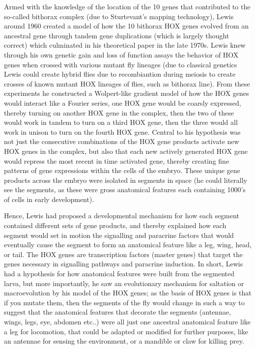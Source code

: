 Armed with the knowledge of the location of the 10 genes that contributed to the so-called bithorax complex (due to Sturtevant's mapping technology), Lewis around 1960 created a model of how the 10 bithorax HOX genes evolved from an ancestral gene through tandem gene duplications (which is largely thought correct) which culminated in his theoretical paper in the late 1970s.  Lewis knew through his own genetic gain and loss of function assays the behavior of HOX genes when crossed with various mutant fly lineages (due to classical genetics Lewis could create hybrid flies due to recombiantion during meiosis to create crosses of known mutant HOX lineages of flies, such as bithorax line).  From these experiments he constructed a Wolpert-like gradient model of how the HOX genes would interact like a Fourier series, one HOX gene would be coarsly expressed, thereby turning on another HOX gene in the complex, then the two of these would work in tandem to turn on a third HOX gene, then the three would all work in unison to turn on the fourth HOX gene.  Central to his hypothesis was not just the consecutive combinations of the HOX gene products activate new HOX genes in the complex, but also that each new actively generated HOX gene would repress the most recent in time activated gene, thereby creating fine patterns of gene expressions within the cells of the embryo.  These unique gene products across the embryo were isolated in segments in space (he could literally see the segments, as these were gross anatomical features each containing 1000's of cells in early development).  

Hence, Lewis had proposed a developmental mechanism for how each segment contained different sets of gene products, and thereby explained how each segment would set in motion the signalling and paracrine factors that would eventually cause the segment to form an anatomical feature like a leg, wing, head, or tail.  The HOX genes are transcription factors (master genes) that target the genes necessary in signalling pathways and paracrine induction.   In short, Lewis had a hypothesis for how anatomical features were built from the segmented larva, but more importantly, he saw an evolutionary mechanism for saltation or macroevolution by his model of the HOX genes; as the basis of HOX genes is that if you mutate them, then the segments of the fly would change in such a way to suggest that the anatomical features that decorate the segments (antennae, wings, legs, eye, abdomen etc..) were all just one ancestral anatomical feature like a leg for locomotion, that could be adapted or modified for further purposes, like an antennae for sensing the environment, or a mandible or claw for killing prey.

